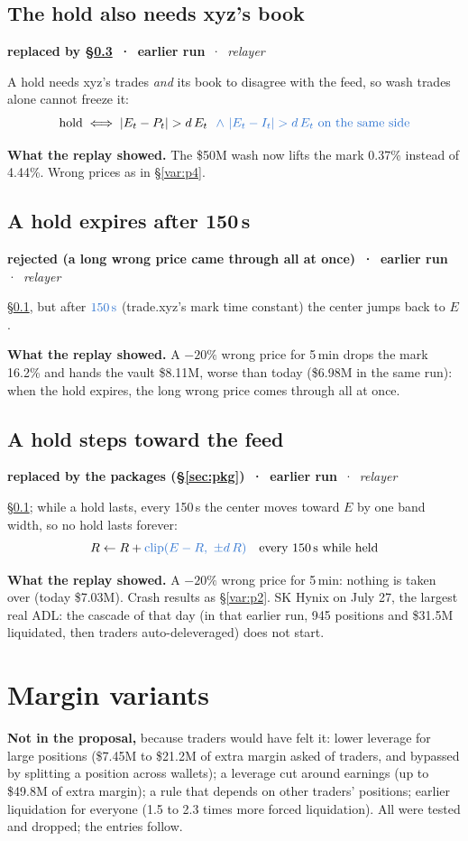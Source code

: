 \documentclass[10.5pt,a4paper]{article}
\newcommand{\chg}[1]{\ensuremath{{\color[HTML]{2F74D0}#1}}}
\newcommand{\clip}{\operatorname{clip}}
\newcommand{\st}[3]{\textcolor{#1}{\textbf{#2}} \,·\, \emph{#3}\par}
\newcommand{\res}[1]{\par\textbf{What the replay showed.} #1\par}
\begin{document}
\subsection{The hold also needs xyz's book}\label{var:p4b}
\st{sup}{replaced by \S\ref{var:p4d} \,·\, earlier run}{relayer}
A hold needs xyz's trades \emph{and} its book to disagree with the feed, so wash trades alone cannot freeze it:
\begin{equation}
\text{hold} \iff |E_t - P_t| > d\,E_t\ \ \chg{\wedge\ |E_t - I_t| > d\,E_t \text{ on the same side}}
\end{equation}
\res{The \$50M wash now lifts the mark 0.37\% instead of 4.44\%. Wrong prices as in \S\ref{var:p4}.}

\subsection{A hold expires after 150\,s}\label{var:p4c}
\st{rej}{rejected (a long wrong price came through all at once) \,·\, earlier run}{relayer}
\S\ref{var:p4b}, but after $\chg{150\,\text{s}}$ (trade.xyz's mark time constant) the center jumps back to $E$.
\res{A $-20\%$ wrong price for 5\,min drops the mark 16.2\% and hands the vault \$8.11M, worse than today (\$6.98M in the same run): when the hold expires, the long wrong price comes through all at once.}

\subsection{A hold steps toward the feed}\label{var:p4d}
\st{sup}{replaced by the packages (\S\ref{sec:pkg}) \,·\, earlier run}{relayer}
\S\ref{var:p4b}; while a hold lasts, every 150\,s the center moves toward $E$ by one band width, so no hold lasts forever:
\begin{equation}
R \leftarrow R + \chg{\clip(E - R,\ \pm d\,R)}\quad\text{every 150\,s while held}
\end{equation}
\res{A $-20\%$ wrong price for 5\,min: nothing is taken over (today \$7.03M). Crash results as \S\ref{var:p2}. SK Hynix on July 27, the largest real ADL: the cascade of that day (in that earlier run, 945 positions and \$31.5M liquidated, then traders auto-deleveraged) does not start.}

\section{Margin variants}\label{sec:margin}
\textbf{Not in the proposal,} because traders would have felt it: lower leverage for large positions (\$7.45M to \$21.2M of extra margin asked of traders, and bypassed by splitting a position across wallets); a leverage cut around earnings (up to \$49.8M of extra margin); a rule that depends on other traders' positions; earlier liquidation for everyone (1.5 to 2.3 times more forced liquidation). All were tested and dropped; the entries follow.
\end{document}
